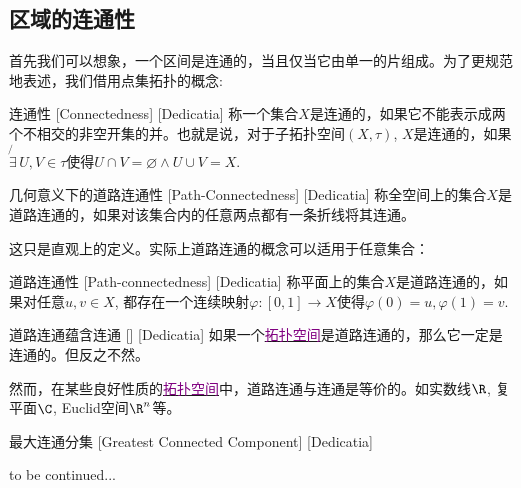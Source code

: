 \documentclass[UTF8]{ctexart}
\newcommand{\hyperrefc}[2]{\hyperref[#1]{\textcolor{purple}{#2}}}
\newcommand{\continued}{{\Large to be continued...}}
\begin{document}
\subsection{区域的连通性}
首先我们可以想象，一个区间是连通的，当且仅当它由单一的片组成。为了更规范地表述，我们借用点集拓扑的概念:
\begin{dfn}
    [UUID]
    {连通性}
    [Connectedness]
    [Dedicatia]
    称一个集合$X$是连通的，如果它不能表示成两个不相交的非空开集的并。也就是说，对于子拓扑空间$(X,\tau)$, $X$是连通的，如果$\not{\exists}\,U,V\in\tau$使得$U\cap V=\varnothing\land U\cup V=X$.
\end{dfn}
\begin{dfn}
    [UUID]
    {几何意义下的道路连通性}
    [Path-Connectedness]
    [Dedicatia]
    称全空间上的集合$X$是道路连通的，如果对该集合内的任意两点都有一条折线将其连通。
\end{dfn}
这只是直观上的定义。实际上道路连通的概念可以适用于任意集合：
\begin{dfn}
    [UUID]
    {道路连通性}
    [Path-connectedness]
    [Dedicatia]
    称平面上的集合$X$是道路连通的，如果对任意$u,v\in X$, 都存在一个连续映射$\varphi:[0,1]\to X$使得$\varphi(0)=u, \varphi(1)=v$.
\end{dfn}
\begin{thm}
    [UUID]
    {道路连通蕴含连通}
    []
    [Dedicatia]
    如果一个\hyperrefc{dfn:TopologicalSpace}{拓扑空间}是道路连通的，那么它一定是连通的。但反之不然。
\end{thm}
然而，在某些良好性质的\hyperrefc{dfn:TopologicalSpace}{拓扑空间}中，道路连通与连通是等价的。如实数线$\R$, 复平面$\C$, Euclid空间$\R^n$等。
\begin{dfn}
    [UUID]
    {最大连通分集}
    [Greatest Connected Component]
    [Dedicatia]
\end{dfn}
\continued
\end{document}
